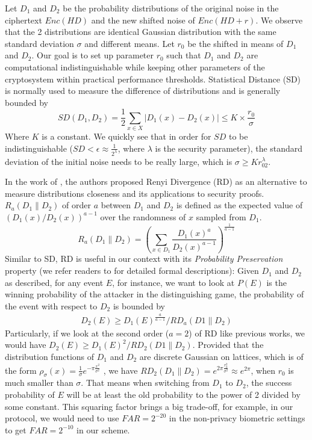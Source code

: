Let $D_1$ and $D_2$ be the probability distributions of the original noise in the ciphertext $Enc(HD)$ and the new shifted noise of $Enc(HD+r)$. We observe that the
2 distributions are identical Gaussian distribution with the same standard deviation
$\sigma$ and different means. Let $r_0$ be the shifted in means of $D_1$ and $D_2$.
Our goal is to set up parameter $r_0$ such that $D_1$ and $D_2$ are computational
indistinguishable while keeping other parameters of the cryptosystem within practical
performance
thresholds. Statistical Distance (SD) is normally used to measure the difference of distributions and is generally bounded by
\[
SD(D_1, D_2) = \frac{1}{2}\sum_{x\in X}|D_1(x) - D_2(x)| \leq K\times \frac{r_0}
{\sigma}
\]
Where $K$ is a constant. We quickly see that in order for $SD$ to be indistinguishable ($SD < \epsilon \approx \frac{1}{2^\lambda}$, where $\lambda$ is
the security parameter), the standard deviation of the initial noise needs to be really large, which is $\sigma \geq Kr_02^\lambda$.

In the work of \cite{bai2015improved}, the authors proposed Renyi Divergence (RD) as
an alternative to measure distributions closeness and its applications to security proofs. $R_a(D_1\|D_2)$ of order $a$
between $D_1$ and $D_2$ is defined as the expected value of $(D_1(x)/D_2(x))^{a-1}$ over the randomness of $x$ sampled from $D_1$.
\[
R_a(D_1\|D_2) = \left( \sum_{x \in D_1}\frac{D_1(x)^a}{D_2(x)^{a-1}} \right)^
{\frac{1}{a-1}}
\]
Similar to SD, RD is useful in our context with its \textit{Probability Preservation} property (we refer readers to \cite{bai2015improved} for detailed formal
descriptions): Given $D_1$ and $D_2$ as described, for any event $E$, for instance, we want to look at $P(E)$ is the winning probability of the attacker in the distinguishing game, the probability of the event with respect to $D_2$ is bounded by
\begin{align}
\label{eq:renyi}
D_2(E) \geq D_1(E)^{\frac{a}{a-1}}/RD_a(D1\|D_2)
\end{align}
Particularly, if we look at the second order ($a = 2$) of RD like previous works, we would have
$
D_2(E) \geq D_1(E)^2/RD_2(D1\|D_2)
$.
Provided that the distribution functions of $D_1$ and $D_2$ are discrete Gaussian on lattices, which is of the form $\rho_\sigma(x) = \frac{1}{\sigma}e^{-\pi\frac{x^2}
	{\sigma^2}}$ , we have $RD_2(D_1\|D_2) = e^{2\pi \frac{r_0^2}{\sigma^2}}
\approx e^{2\pi}$, when $r_0$ is much smaller than $\sigma$. That means when switching from $D_1$ to $D_2$, the success probability of $E$ will be at least the old probability to the power of 2 divided by some constant. This squaring factor
brings a big trade-off, for example, in our protocol, we would need to use $FAR = 2^{-20}$ in the non-privacy biometric settings to get $FAR=2^{-10}$ in our scheme.

